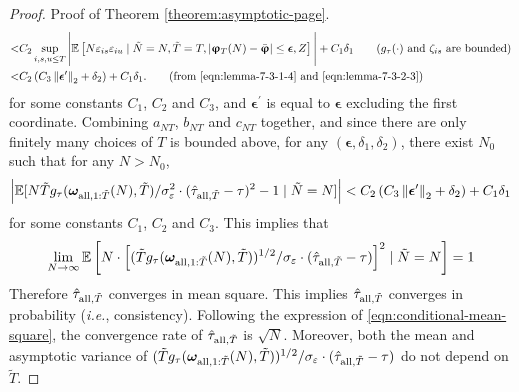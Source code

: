 \begin{proof}{Proof of Theorem \ref{theorem:asymptotic-page}.}
\begin{align*}
    <& C_2 \sup_{i,s,u\leq T} \Bigg|\+E \left[ N\varepsilon_{is} \varepsilon_{iu} \mid \tilde{N} = N, \tilde{T} = T, |\bm{\upvarphi}_T(N) - \bar{\bm{\upvarphi}}|  \leq  \bm\epsilon, Z \right]\Bigg|  + C_1 \delta_1 \tag{$g_\tau(\cdot)$ and $\zeta_{is}$ are bounded} \\
    <& C_2 \left(C_3 \norm{{\bm{\epsilon}}^\prime}_2  + \delta_2\right) + C_1 \delta_1. \tag{from \eqref{eqn:lemma-7-3-1-4} and \eqref{eqn:lemma-7-3-2-3}}
\end{align*}
for some constants $C_1$, $C_2$ and $C_3$, and ${\bm{\epsilon}}^\prime$ is equal to ${\bm{\epsilon}}$ excluding the first coordinate. 
Combining $a_{NT}$, $b_{NT}$ and $c_{NT}$ together, and since there are only finitely many choices of  $T$ is bounded above, for any $(\bm\epsilon, \delta_1, \delta_2)$, there exist $N_0$ such that for any $N > N_0$,
\begin{align*}
    \left|\mathbb{E}[N \tilde{T}g_\tau(\bm{\omega}_{\mathrm{all},1:\tilde{T}}(N),\tilde{T})/\sigma_\varepsilon^2 \cdot (\hat{\tau}_{\mathrm{all},\tilde{T}} - \tau)^2 - 1\mid \tilde{N}= N]\right| < C_2 \left(C_3 \left\lVert{\bm{\epsilon}}^\prime\right\rVert_2  + \delta_2\right) + C_1 \delta_1
\end{align*}
for some constants $C_1$, $C_2$ and $C_3$. This implies that 
\begin{align}
    \lim_{N \rightarrow \infty} \mathbb{E}\left[N \cdot \left[(\tilde{T}g_\tau(\bm{\omega}_{\mathrm{all},1:\tilde{T}}(N),\tilde{T}))^{1/2}/\sigma_\varepsilon \cdot (\hat{\tau}_{\mathrm{all},\tilde{T}} - \tau) \right]^2 \mid \tilde{N}= N\right] = 1 \label{eqn:conditional-mean-square}
\end{align}
Therefore $\hat{\tau}_{\mathrm{all},\tilde{T}}$ converges in mean square. This implies $\hat{\tau}_{\mathrm{all},\tilde{T}}$ converges in probability ({\it i.e.}, consistency). Following the expression of \eqref{eqn:conditional-mean-square}, the convergence rate of $\hat{\tau}_{\mathrm{all},\tilde{T}}$ is $\sqrt{N}$. Moreover, both the mean and asymptotic variance of $(\tilde{T}g_\tau(\bm{\omega}_{\mathrm{all},1:\tilde{T}}(N),\tilde{T}))^{1/2}/\sigma_\varepsilon \cdot (\hat{\tau}_{\mathrm{all},\tilde{T}} - \tau)$ do not depend on $\tilde{T}$. 


\end{proof}
